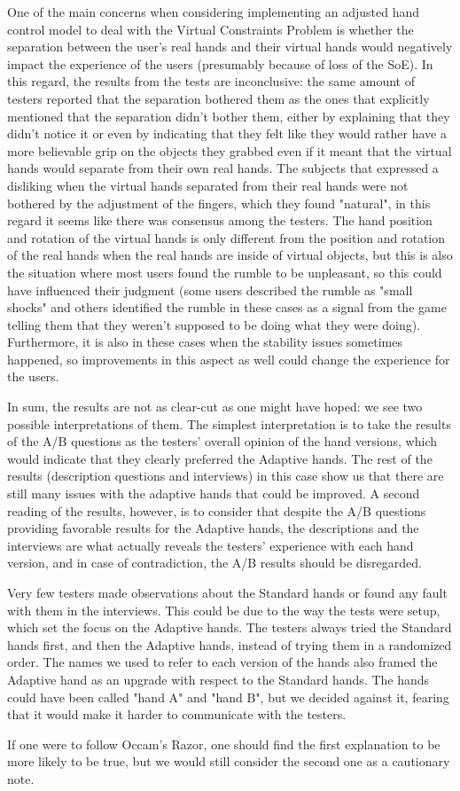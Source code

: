 One of the main concerns when considering implementing an adjusted hand control model to deal with the Virtual Constraints Problem is whether the separation between the user's real hands and their virtual hands would negatively impact the experience of the users (presumably because of loss of the SoE). In this regard, the results from the tests are inconclusive: the same amount of testers reported that the separation bothered them as the ones that explicitly mentioned that the separation didn't bother them, either by explaining that they didn't notice it or even by indicating that they felt like they would rather have a more believable grip on the objects they grabbed even if it meant that the virtual hands would separate from their own real hands. The subjects that expressed a disliking when the virtual hands separated from their real hands were not bothered by the adjustment of the fingers, which they found "natural", in this regard it seems like there was consensus among the testers. The hand position and rotation of the virtual hands is only different from the position and rotation of the real hands when the real hands are inside of virtual objects, but this is also the situation where most users found the rumble to be unpleasant, so this could have influenced their judgment (some users described the rumble as "small shocks" and others identified the rumble in these cases as a signal from the game telling them that they weren't supposed to be doing what they were doing). Furthermore, it is also in these cases when the stability issues sometimes happened, so improvements in this aspect as well could change the experience for the users. 

In sum, the results are not as clear-cut as one might have hoped: we see two possible interpretations of them. The simplest interpretation is to take the results of the A/B questions as the testers' overall opinion of the hand versions, which would indicate that they clearly preferred the Adaptive hands. The rest of the results (description questions and interviews) in this case show us that there are still many issues with the adaptive hands that could be improved. A second reading of the results, however, is to consider that despite the A/B questions providing favorable results for the Adaptive hands, the descriptions and the interviews are what actually reveals the testers' experience with each hand version, and in case of contradiction, the A/B results should be disregarded. 

Very few testers made observations about the Standard hands or found any fault with them in the interviews. This could be due to the way the tests were setup, which set the focus on the Adaptive hands. The testers always tried the Standard hands first, and then the Adaptive hands, instead of trying them in a randomized order. The names we used to refer to each version of the hands also framed the Adaptive hand as an upgrade with respect to the Standard hands. The hands could have been called "hand A" and "hand B", but we decided against it, fearing that it would make it harder to communicate with the testers.

If one were to follow Occam's Razor, one should find the first explanation to be more likely to be true, but we would still consider the second one as a cautionary note.
